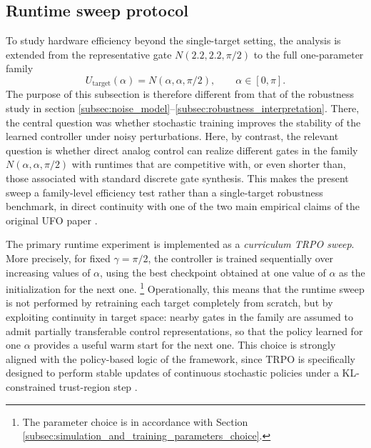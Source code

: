 \subsection{Runtime sweep protocol}
\label{subsec:runtime_sweep_protocol}

To study hardware efficiency beyond the single-target setting, the analysis is extended from the representative gate
\(N(2.2,2.2,\pi/2)\) to the full one-parameter family
\begin{equation}
U_{\mathrm{target}}(\alpha)
=
N(\alpha,\alpha,\pi/2),
\qquad
\alpha \in [0,\pi].
\label{eq:runtime_target_family}
\end{equation}
The purpose of this subsection is therefore different from that of the robustness study in
section \ref{subsec:noise_model}--\ref{subsec:robustness_interpretation}. There, the central question was whether
stochastic training improves the stability of the learned controller under noisy perturbations. Here, by contrast,
the relevant question is whether direct analog control can realize different gates in the family
\(N(\alpha,\alpha,\pi/2)\) with runtimes that are competitive with, or even shorter than, those associated with
standard discrete gate synthesis. This makes the present sweep a family-level efficiency test rather than a
single-target robustness benchmark, in direct continuity with one of the two main empirical claims of the original
UFO paper \cite{Niu2019}.

The primary runtime experiment is implemented as a \emph{curriculum TRPO sweep}. More precisely, for fixed
\(\gamma=\pi/2\), the controller is trained sequentially over increasing values of \(\alpha\), using the best
checkpoint obtained at one value of \(\alpha\) as the initialization for the next one. 
\footnote{The parameter choice is in accordance with Section \ref{subsec:simulation_and_training_parameters_choice}.} 
Operationally, this means that the runtime sweep is not performed by retraining each target completely
from scratch, but by exploiting continuity in target space: nearby gates in the family are assumed to admit
partially transferable control representations, so that the policy learned for one \(\alpha\) provides a useful
warm start for the next one. This choice is strongly aligned with the policy-based logic of the framework, since
TRPO is specifically designed to perform stable updates of continuous stochastic policies under a KL-constrained
trust-region step \cite{Schulman2015}.

